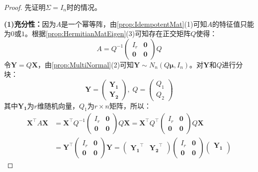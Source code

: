 \begin{proof}
	先证明$\Sigma=I_n$时的情况。\par
	\textbf{(1)充分性：}因为$A$是一个幂等阵，由\cref{prop:IdempotentMat}(1)可知$A$的特征值只能为$0$或$1$。根据\cref{prop:HermitianMatEigen}(3)可知存在正交矩阵$Q$使得：
	\begin{equation*}
		A=Q^{-1}
		\begin{pmatrix}
			I_r & \mathbf{0} \\
			\mathbf{0} & \mathbf{0}
		\end{pmatrix}Q
	\end{equation*}
	令$\mathbf{Y}=Q\mathbf{X}$，由\cref{prop:MultiNormal}(2)可知$\mathbf{Y}\sim N_n(Q\boldsymbol{\mu},I_n)$。对$\mathbf{Y}$和$Q$进行分块：
	\begin{equation*}
		\mathbf{Y}=
		\begin{pmatrix}
			\mathbf{Y_1} \\
			\mathbf{Y_2}
		\end{pmatrix},\;
		Q=
		\begin{pmatrix}
			Q_1 \\
			Q_2
		\end{pmatrix}
	\end{equation*}
	其中$\mathbf{Y_1}$为$r$维随机向量，$Q_1$为$r\times n$矩阵，所以：
	\begin{align*}
		\mathbf{X}^{\top}A\mathbf{X}&=\mathbf{X}^{\top}Q^{-1}
		\begin{pmatrix}
			I_r & \mathbf{0} \\
			\mathbf{0} & \mathbf{0}
		\end{pmatrix}Q\mathbf{X}=\mathbf{X}^{\top}Q^{\top}
		\begin{pmatrix}
			I_r & \mathbf{0} \\
			\mathbf{0} & \mathbf{0}
		\end{pmatrix}Q\mathbf{X} \\
		&=\mathbf{Y}^{\top}
		\begin{pmatrix}
			I_r & \mathbf{0} \\
			\mathbf{0} & \mathbf{0}
		\end{pmatrix}\mathbf{Y}
		=
		\begin{pmatrix}
			\mathbf{Y_1}^{\top} & \mathbf{Y_2}^{\top}
		\end{pmatrix}
		\begin{pmatrix}
			I_r & \mathbf{0} \\
			\mathbf{0} & \mathbf{0}
		\end{pmatrix}
		\begin{pmatrix}
			\mathbf{Y_1} \\

\end{pmatrix}
\end{align*}
\end{proof}
